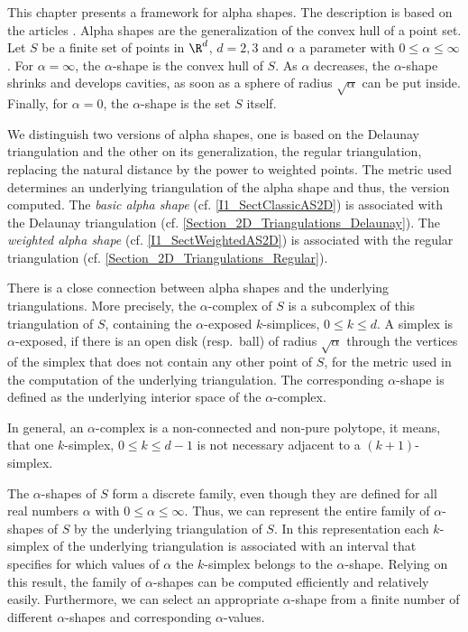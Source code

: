 This chapter presents a framework for alpha shapes. The description is based on
the articles \cite{em-tdas-94,e-was-92}. Alpha shapes are
the generalization of the convex hull of a point set. Let $S$ be a finite set of
points in $\R^d$, $d = 2,3$ and $\alpha$ a parameter with $0 \leq \alpha \leq
\infty$. For $\alpha = \infty$, the $\alpha$-shape is the convex hull of $S$. As 
$\alpha$ decreases, the $\alpha$-shape shrinks and develops cavities, as soon as 
a sphere of radius $\sqrt{\alpha}$ can be put inside.
Finally, for $\alpha = 0$, the $\alpha$-shape is the set $S$ itself.

We distinguish two versions of alpha shapes, one is based on the Delaunay
triangulation and the other on its generalization, the regular triangulation,
replacing the natural distance by the power to weighted points. The metric used
determines an underlying triangulation of the alpha shape and thus, the version
computed. 
The {\em basic alpha shape} (cf. \ref{I1_SectClassicAS2D}) is associated with the Delaunay triangulation
(cf. \ref{Section_2D_Triangulations_Delaunay}). 
The {\em weighted alpha shape} (cf. \ref{I1_SectWeightedAS2D}) is associated with the regular triangulation
(cf. \ref{Section_2D_Triangulations_Regular}). 

There is a close connection between alpha shapes and the underlying
triangulations. More precisely, the $\alpha$-complex of $S$ is a
subcomplex of this triangulation of $S$, containing the $\alpha$-exposed
$k$-simplices, $0 \leq k \leq d$. A simplex is $\alpha$-exposed, if there is an
open disk (resp.\ ball) of radius $\sqrt{\alpha}$ through the vertices of the
simplex that does not contain any other point of $S$, for the metric used in
the computation of the underlying triangulation.  The corresponding
$\alpha$-shape is defined as the underlying interior space of the
$\alpha$-complex. 

In general, an $\alpha$-complex is a non-connected and non-pure polytope, it
means, that one $k$-simplex, $0 \leq k \leq d-1$ is not necessary adjacent to
a $(k+1)$-simplex.

The $\alpha$-shapes of $S$ form a discrete family, even though they
are defined for all real numbers $\alpha$ with $0 \leq \alpha
\leq \infty$. Thus, we can represent the entire family of $\alpha$-shapes
of $S$ by the underlying triangulation of $S$. In this representation
each $k$-simplex of the underlying triangulation is associated with an
interval that specifies for which values of $\alpha$ the $k$-simplex
belongs to the $\alpha$-shape. Relying on this result, the family of
$\alpha$-shapes can be computed efficiently and relatively
easily. Furthermore, we can select an appropriate $\alpha$-shape from a
finite number of different $\alpha$-shapes and corresponding
$\alpha$-values.


